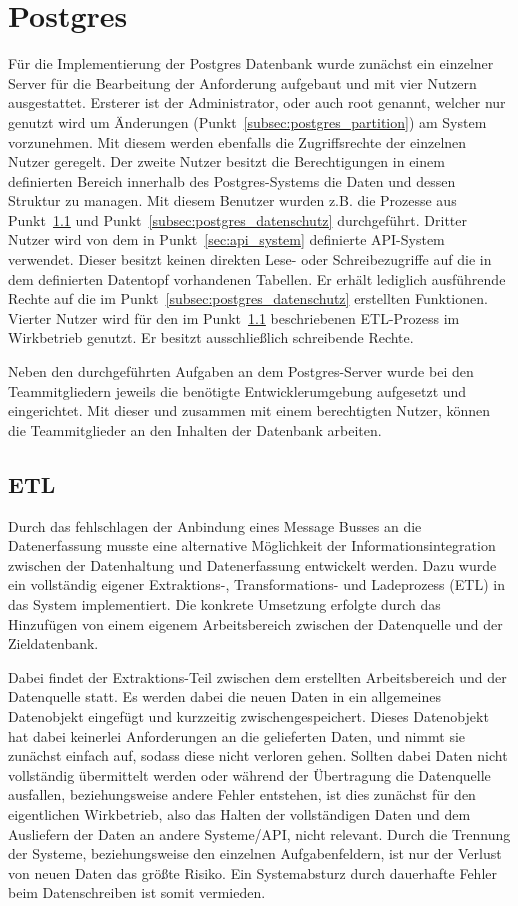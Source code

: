 \section{Postgres}
Für die Implementierung der Postgres Datenbank wurde zunächst ein einzelner
Server für die Bearbeitung der Anforderung aufgebaut und mit vier Nutzern
ausgestattet. Ersterer ist der Administrator, oder auch root genannt, welcher
nur genutzt wird um Änderungen (Punkt~\ref{subsec:postgres_partition}) am
System vorzunehmen. Mit diesem werden ebenfalls die Zugriffsrechte der
einzelnen Nutzer geregelt. Der zweite Nutzer besitzt die Berechtigungen in
einem definierten Bereich innerhalb des Postgres-Systems die
Daten und dessen Struktur zu managen. Mit diesem Benutzer wurden z.B. die
Prozesse aus Punkt~\ref{subsec:postgres_etl} und
Punkt~\ref{subsec:postgres_datenschutz} durchgeführt. Dritter Nutzer wird
von dem in Punkt~\ref{sec:api_system} definierte API-System verwendet. Dieser
besitzt keinen direkten Lese- oder Schreibezugriffe auf die in dem definierten
Datentopf vorhandenen Tabellen. Er erhält lediglich ausführende Rechte auf die
im Punkt~\ref{subsec:postgres_datenschutz} erstellten Funktionen. Vierter
Nutzer wird für den im Punkt~\ref{subsec:postgres_etl} beschriebenen ETL-Prozess
im Wirkbetrieb genutzt. Er besitzt ausschließlich schreibende Rechte.

Neben den durchgeführten Aufgaben an dem Postgres-Server wurde bei
den Teammitgliedern jeweils die benötigte Entwicklerumgebung aufgesetzt
und eingerichtet. Mit dieser und zusammen mit einem berechtigten Nutzer,
können die Teammitglieder an den Inhalten der Datenbank arbeiten.
\nl%

\subsection{ETL}
\label{subsec:postgres_etl}
Durch das fehlschlagen der Anbindung eines Message Busses an die Datenerfassung
musste eine alternative Möglichkeit der Informationsintegration zwischen der
Datenhaltung und Datenerfassung entwickelt werden. Dazu wurde ein vollständig
eigener Extraktions-, Transformations- und Ladeprozess (ETL) in das System
implementiert. Die konkrete Umsetzung erfolgte durch das Hinzufügen von einem
eigenem Arbeitsbereich zwischen der Datenquelle und der Zieldatenbank.

Dabei findet der Extraktions-Teil zwischen dem erstellten Arbeitsbereich und
der Datenquelle statt. Es werden dabei die neuen Daten in ein allgemeines
Datenobjekt eingefügt und kurzzeitig zwischengespeichert. Dieses Datenobjekt
hat dabei keinerlei Anforderungen an die gelieferten Daten, und nimmt sie
zunächst einfach auf, sodass diese nicht verloren gehen. Sollten dabei
Daten nicht vollständig übermittelt werden oder während der Übertragung die
Datenquelle ausfallen, beziehungsweise andere Fehler entstehen, ist dies
zunächst für den eigentlichen Wirkbetrieb, also das Halten der vollständigen
Daten und dem Ausliefern der Daten an andere Systeme/API, nicht relevant.
Durch die Trennung der Systeme, beziehungsweise den einzelnen Aufgabenfeldern,
ist nur der Verlust von neuen Daten das größte Risiko. Ein Systemabsturz durch
dauerhafte Fehler beim Datenschreiben ist somit vermieden.

